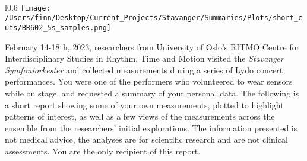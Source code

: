 \ %
\vspace{0.5cm}

\begin{center}
\begin{minipage}[h]{0.90\linewidth}
	\begin{wrapfigure}{l}{0.6\textwidth}
		\texttt{[image: /Users/finn/Desktop/Current\_Projects/Stavanger/Summaries/Plots/short\_cuts/BR602\_5s\_samples.png]}
		\\	%
	\end{wrapfigure}
	
	 February 14-18th, 2023, researchers from University of Oslo's RITMO Centre for Interdisciplinary Studies in Rhythm, Time and Motion visited the \textit{Stavanger Symfoniorkester} and collected measurements during a series of Lydo concert performances. You were one of the performers who volunteered to wear sensors while on stage, and requested a summary of your personal data. The following is a short report showing some of your own measurements, plotted to highlight patterns of interest, as well as a few views of the measurements across the ensemble from the researchers' initial explorations. The information presented is not medical advice, the analyses are for scientific research and are not clinical assessments. You are the only recipient of this report. 
\end{minipage}
\end{center}
\ %
\vspace{1cm}
	\SepRule

